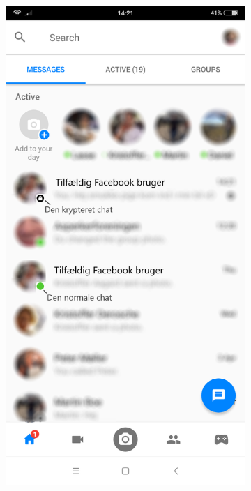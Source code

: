 \begin{figure}[H]
\begin{center}
\begin{subfigure}{0.33\textwidth}
            \caption{}
            \label{fig:}
        \end{subfigure}
        \begin{subfigure}{0.33\textwidth}
            \centering
            \includegraphics[scale=0.15]{Projectdoc/Problemanalyse/Illustrationer/5-fbchat.png} 
            \caption{}
            \label{fig:}
        \end{subfigure}
    \end{center}
    \caption{}
    \label{fig:}
\end{figure}
